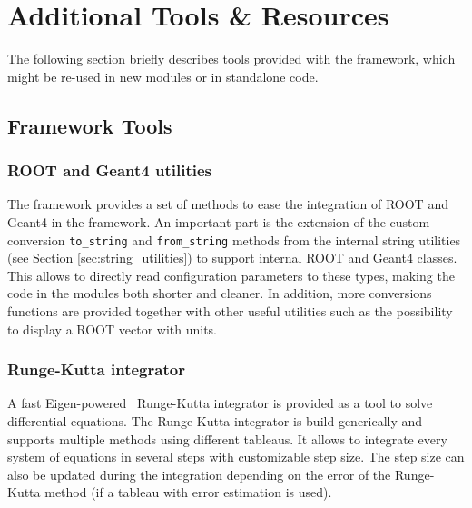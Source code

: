 \section{Additional Tools \& Resources}
\label{sec:additional_tools_resources}

The following section briefly describes tools provided with the \apsq framework, which might be re-used in new modules or in standalone code.

\subsection{Framework Tools}
\subsubsection{ROOT and Geant4 utilities}
\label{sec:root_and_geant4_utilities}
The framework provides a set of methods to ease the integration of ROOT and Geant4 in the framework.
An important part is the extension of the custom conversion \texttt{to\_string} and \texttt{from\_string} methods from the internal string utilities (see Section \ref{sec:string_utilities}) to support internal ROOT and Geant4 classes.
This allows to directly read configuration parameters to these types, making the code in the modules both shorter and cleaner.
In addition, more conversions functions are provided together with other useful utilities such as the possibility to display a ROOT vector with units.

\subsubsection{Runge-Kutta integrator}
A fast Eigen-powered~\cite{eigen3} Runge-Kutta integrator is provided as a tool to solve differential equations.
The Runge-Kutta integrator is build generically and supports multiple methods using different tableaus.
It allows to integrate every system of equations in several steps with customizable step size.
The step size can also be updated during the integration depending on the error of the Runge-Kutta method (if a tableau with error estimation is used).

\label{sec:tcad_electric_field_converter}

\label{sec:root_analysis_macros}
